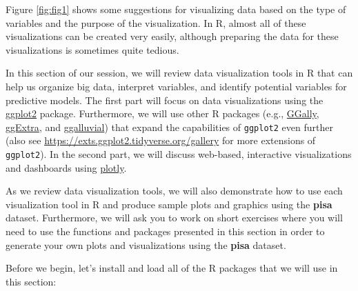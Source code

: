 \documentclass[]{book}
\begin{document}
Figure \ref{fig:fig1} shows some suggestions for visualizing data based on the type of variables and the purpose of the visualization. In R, almost all of these visualizations can be created very easily, although preparing the data for these visualizations is sometimes quite tedious.

In this section of our session, we will review data visualization tools in R that can help us organize big data, interpret variables, and identify potential variables for predictive models. The first part will focus on data visualizations using the \href{https://ggplot2.tidyverse.org/}{ggplot2} package. Furthermore, we will use other R packages (e.g., \href{http://ggobi.github.io/ggally/\#ggally}{GGally}, \href{https://www.ggplot2-exts.org/ggExtra.html}{ggExtra}, and \href{http://corybrunson.github.io/ggalluvial/}{ggalluvial}) that expand the capabilities of \texttt{ggplot2} even further (also see \url{https://exts.ggplot2.tidyverse.org/gallery} for more extensions of \texttt{ggplot2}). In the second part, we will discuss web-based, interactive visualizations and dashboards using \href{https://plot.ly/r/}{plotly}.

As we review data visualization tools, we will also demonstrate how to use each visualization tool in R and produce sample plots and graphics using the \textbf{pisa} dataset. Furthermore, we will ask you to work on short exercises where you will need to use the functions and packages presented in this section in order to generate your own plots and visualizations using the \textbf{pisa} dataset.

Before we begin, let's install and load all of the R packages that we will use in this section:
\end{document}
